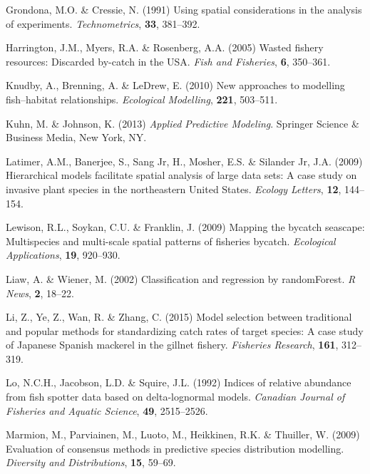 \documentclass[]{article}
\begin{document}
\leavevmode\hypertarget{ref-grondona1991}{}%
Grondona, M.O. \& Cressie, N. (1991) Using spatial considerations in the
analysis of experiments. \emph{Technometrics}, \textbf{33}, 381--392.

\leavevmode\hypertarget{ref-harrington2005}{}%
Harrington, J.M., Myers, R.A. \& Rosenberg, A.A. (2005) Wasted fishery
resources: Discarded by-catch in the USA. \emph{Fish and Fisheries},
\textbf{6}, 350--361.

\leavevmode\hypertarget{ref-knudby2010}{}%
Knudby, A., Brenning, A. \& LeDrew, E. (2010) New approaches to
modelling fish--habitat relationships. \emph{Ecological Modelling},
\textbf{221}, 503--511.

\leavevmode\hypertarget{ref-kuhn2013}{}%
Kuhn, M. \& Johnson, K. (2013) \emph{Applied Predictive Modeling}.
Springer Science \& Business Media, New York, NY.

\leavevmode\hypertarget{ref-latimer2009}{}%
Latimer, A.M., Banerjee, S., Sang Jr, H., Mosher, E.S. \& Silander Jr,
J.A. (2009) Hierarchical models facilitate spatial analysis of large
data sets: A case study on invasive plant species in the northeastern
United States. \emph{Ecology Letters}, \textbf{12}, 144--154.

\leavevmode\hypertarget{ref-lewison2009}{}%
Lewison, R.L., Soykan, C.U. \& Franklin, J. (2009) Mapping the bycatch
seascape: Multispecies and multi-scale spatial patterns of fisheries
bycatch. \emph{Ecological Applications}, \textbf{19}, 920--930.

\leavevmode\hypertarget{ref-liaw2002}{}%
Liaw, A. \& Wiener, M. (2002) Classification and regression by
randomForest. \emph{R News}, \textbf{2}, 18--22.

\leavevmode\hypertarget{ref-li2015}{}%
Li, Z., Ye, Z., Wan, R. \& Zhang, C. (2015) Model selection between
traditional and popular methods for standardizing catch rates of target
species: A case study of Japanese Spanish mackerel in the gillnet
fishery. \emph{Fisheries Research}, \textbf{161}, 312--319.

\leavevmode\hypertarget{ref-lo1992}{}%
Lo, N.C.H., Jacobson, L.D. \& Squire, J.L. (1992) Indices of relative
abundance from fish spotter data based on delta-lognormal models.
\emph{Canadian Journal of Fisheries and Aquatic Science}, \textbf{49},
2515--2526.

\leavevmode\hypertarget{ref-marmion2009}{}%
Marmion, M., Parviainen, M., Luoto, M., Heikkinen, R.K. \& Thuiller, W.
(2009) Evaluation of consensus methods in predictive species
distribution modelling. \emph{Diversity and Distributions}, \textbf{15},
59--69.
\end{document}
